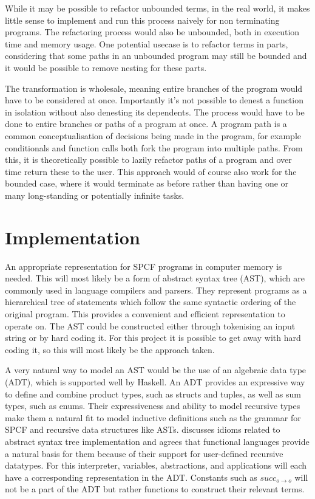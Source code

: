 \documentclass[12pt,a4paper]{report}
\theoremstyle{definition}
\theoremstyle{remark}
\begin{document}
While it may be possible to refactor unbounded terms, in the real world, it makes little sense to implement and run this process naively for non terminating programs. The refactoring process would also be unbounded, both in execution time and memory usage. One potential usecase is to refactor terms in parts, considering that some paths in an unbounded program may still be bounded and it would be possible to remove nesting for these parts.

The transformation is wholesale, meaning entire branches of the program would have to be considered at once. Importantly it's not possible to denest a function in isolation without also denesting its dependents. The process would have to be done to entire branches or paths of a program at once. A program path is a common conceptualisation of decisions being made in the program, for example conditionals and function calls both fork the program into multiple paths. From this, it is theoretically possible to lazily refactor paths of a program and over time return these to the user. This approach would of course also work for the bounded case, where it would terminate as before rather than having one or many long-standing or potentially infinite tasks. 

\section{Implementation}
An appropriate representation for SPCF programs in computer memory is needed. This will most likely be a form of abstract syntax tree (AST), which are commonly used in language compilers and parsers. They represent programs as a hierarchical tree of statements which follow the same syntactic ordering of the original program. This provides a convenient and efficient representation to operate on. The AST could be constructed either through tokenising an input string or by hard coding it. For this project it is possible to get away with hard coding it, so this will most likely be the approach taken.

A very natural way to model an AST would be the use of an algebraic data type (ADT), which is supported well by Haskell. An ADT provides an expressive way to define and combine product types, such as structs and tuples, as well as sum types, such as enums. Their expressiveness and ability to model recursive types make them a natural fit to model inductive definitions such as the grammar for SPCF and recursive data structures like ASTs. \cite{jones_2003} discusses idioms related to abstract syntax tree implementation and agrees that functional languages provide a natural basis for them because of their support for user-defined recursive datatypes. For this interpreter, variables, abstractions, and applications will each have a corresponding representation in the ADT. Constants such as $succ_{o \rightarrow o}$ will not be a part of the ADT but rather functions to construct their relevant terms.
\end{document}
